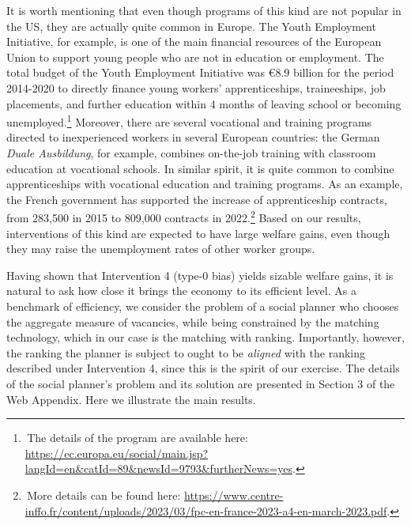 \documentclass[12pt]{article} %
\theoremstyle{definition}
\begin{document}
It is worth mentioning that even though programs of this kind are not popular in the US, they are actually quite common in Europe.
The Youth Employment Initiative, for example, is one of the main financial resources of the European Union to support young people who are not in education or employment.
The total budget of the Youth Employment Initiative was €8.9 billion for the period 2014-2020 to directly finance young workers' apprenticeships, traineeships, job placements, and further education within 4 months of leaving school or becoming unemployed.\footnote{\,The details of the program are available here: \url{https://ec.europa.eu/social/main.jsp?langId=en&catId=89&newsId=9793&furtherNews=yes}.}
Moreover, there are several vocational and training programs directed to inexperienced workers in several European countries: the German \textit{Duale Ausbildung}, for example, combines on-the-job training with classroom education at vocational schools.
In similar spirit, it is quite common to combine apprenticeships with vocational education and training programs.
As an example, the French government has supported the increase of apprenticeship contracts, from 283,500 in 2015 to 809,000 contracts in 2022.\footnote{\,More details can be found here: \url{https://www.centre-inffo.fr/content/uploads/2023/03/fpc-en-france-2023-a4-en-march-2023.pdf}.}
Based on our results, interventions of this kind are expected to have large welfare gains, even though they may raise the unemployment rates of other worker groups.


Having shown that Intervention 4 (type-0 bias) yields sizable welfare gains, it is natural to ask how close it brings the economy to its efficient level. As a benchmark of efficiency, we consider the problem of a social planner who chooses the aggregate measure of vacancies, while being constrained by the matching technology, which in our case is the \cite{petrongolo2001looking} matching with ranking. Importantly, however, the ranking the planner is subject to ought to be \textit{aligned} with the ranking described under Intervention 4, since this is the spirit of our exercise.
The details of the social planner's problem and its solution are presented in Section 3 of the Web Appendix. Here we illustrate the main results. 
\end{document}
